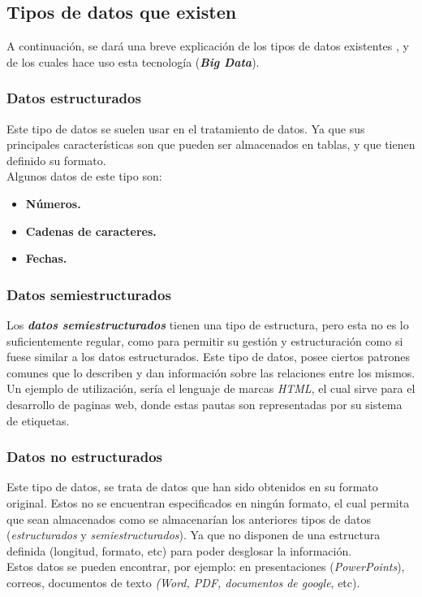 \documentclass[11pt]{diazessay} %
\begin{document}
\subsection*{Tipos de datos que existen}
A continuación, se dará una breve explicación de los tipos de datos existentes \cite{wiki-ucm}, y de los cuales hace uso esta tecnología (\textbf{\textit{Big Data}}).

\subsubsection*{Datos estructurados}
Este tipo de datos se suelen usar en el tratamiento de datos. Ya que sus principales características son que pueden ser almacenados en tablas, y que tienen definido su formato.\\
Algunos datos de este tipo son:

\begin{itemize}
	\item \textbf{Números.}
	\item \textbf{Cadenas de caracteres.}
	\item \textbf{Fechas.}
\end{itemize}

\subsubsection*{Datos semiestructurados}
Los \textbf{\textit{datos semiestructurados}} tienen una tipo de estructura, pero esta no es lo suficientemente regular, como para permitir su gestión y estructuración como si fuese similar a los datos estructurados.
Este tipo de datos, posee ciertos patrones comunes que lo describen y dan información sobre las relaciones entre los mismos.\\
Un ejemplo de utilización, sería el lenguaje de marcas \textit{HTML}, el cual sirve para el desarrollo de paginas web, donde estas pautas son representadas por su sistema de etiquetas.

\subsubsection*{Datos no estructurados}
Este tipo de datos, se trata  de datos que han sido obtenidos en su formato original. Estos no se encuentran especificados en ningún formato, el cual permita que sean almacenados como se almacenarían los anteriores tipos de datos (\textit{estructurados} y \textit{semiestructurados}). Ya que no disponen de una estructura definida (longitud, formato, etc) para poder desglosar la información.\\
Estos datos se pueden encontrar, por ejemplo: en presentaciones (\textit{PowerPoints}), correos, documentos de texto \textit{(Word, PDF, documentos de google}, etc).
\end{document}
